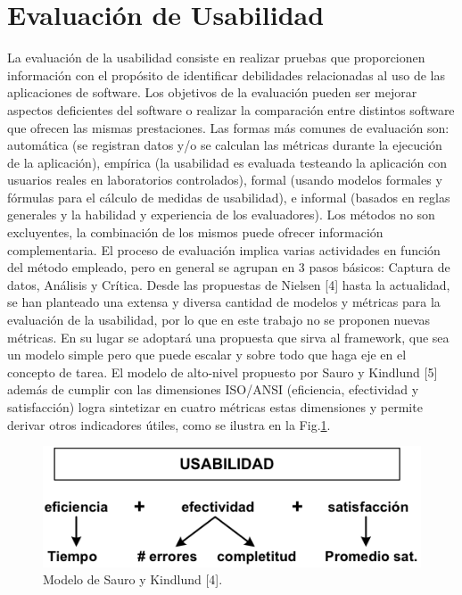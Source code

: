 \section{Evaluación de Usabilidad}
\label{sec:eval_usabilidad}

La evaluación de la usabilidad consiste en realizar pruebas que proporcionen información con el propósito de identificar debilidades relacionadas al uso de las aplicaciones de software. Los objetivos de la evaluación pueden ser mejorar aspectos deficientes del software o realizar la comparación entre distintos software que ofrecen las mismas prestaciones. Las formas más comunes de evaluación son: automática (se registran datos y/o se calculan las métricas durante la ejecución de la aplicación), empírica (la usabilidad es evaluada testeando la aplicación con usuarios reales en laboratorios controlados), formal (usando modelos formales y fórmulas para el cálculo de medidas de usabilidad), e informal (basados en reglas generales y la habilidad y experiencia de los evaluadores). Los métodos no son excluyentes, la combinación de los mismos puede ofrecer información complementaria. El  proceso de evaluación implica varias actividades en función del método empleado, pero en general se agrupan en 3 pasos básicos: Captura de datos, Análisis y Crítica.
Desde las propuestas de Nielsen [4] hasta la actualidad, se han planteado una extensa y diversa cantidad de modelos y métricas para la evaluación de la usabilidad, por lo que en este trabajo no se proponen nuevas métricas. En su lugar se adoptará una propuesta que sirva al framework, que sea un modelo simple pero que puede escalar y sobre todo que haga eje en el concepto de tarea. El modelo de alto-nivel propuesto por Sauro y Kindlund [5] además de cumplir con las dimensiones ISO/ANSI (eficiencia, efectividad y satisfacción) logra sintetizar en cuatro métricas estas dimensiones y permite derivar otros indicadores útiles, como se ilustra en la Fig.\ref{fig:fig1}. 

\begin{figure}[ht!]
	\centering
	\includegraphics[scale=1]{figs/fig1.png}
	\caption{\label{fig:fig1} Modelo de Sauro y Kindlund [4].}
\end{figure}

